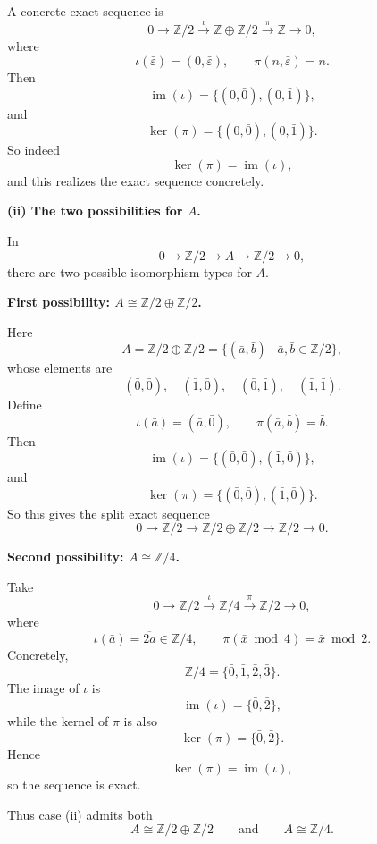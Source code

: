 \begin{solution}
A concrete exact sequence is
\[
0\longrightarrow \mathbb Z/2
\xrightarrow{\ \iota\ }
\mathbb Z\oplus \mathbb Z/2
\xrightarrow{\ \pi\ }
\mathbb Z
\longrightarrow 0,
\]
where
\[
\iota(\bar\varepsilon)=(0,\bar\varepsilon),
\qquad
\pi(n,\bar\varepsilon)=n.
\]
Then
\[
\operatorname{im}(\iota)=\{(0,\bar0),(0,\bar1)\},
\]
and
\[
\ker(\pi)=\{(0,\bar0),(0,\bar1)\}.
\]
So indeed
\[
\ker(\pi)=\operatorname{im}(\iota),
\]
and this realizes the exact sequence concretely.

\par

\textbf{(ii) The two possibilities for \(A\).}

In
\[
0\longrightarrow \mathbb Z/2 \longrightarrow A \longrightarrow \mathbb Z/2 \longrightarrow 0,
\]
there are two possible isomorphism types for \(A\).

\par

\textbf{First possibility: \(A\cong \mathbb Z/2\oplus \mathbb Z/2\).}

Here
\[
A=\mathbb Z/2\oplus \mathbb Z/2
=\{(\bar a,\bar b)\mid \bar a,\bar b\in \mathbb Z/2\},
\]
whose elements are
\[
(\bar0,\bar0),\quad (\bar1,\bar0),\quad (\bar0,\bar1),\quad (\bar1,\bar1).
\]
Define
\[
\iota(\bar a)=(\bar a,\bar0),
\qquad
\pi(\bar a,\bar b)=\bar b.
\]
Then
\[
\operatorname{im}(\iota)=\{(\bar0,\bar0),(\bar1,\bar0)\},
\]
and
\[
\ker(\pi)=\{(\bar0,\bar0),(\bar1,\bar0)\}.
\]
So this gives the split exact sequence
\[
0\longrightarrow \mathbb Z/2
\longrightarrow \mathbb Z/2\oplus \mathbb Z/2
\longrightarrow \mathbb Z/2
\longrightarrow 0.
\]

\par

\textbf{Second possibility: \(A\cong \mathbb Z/4\).}

Take
\[
0\longrightarrow \mathbb Z/2
\xrightarrow{\ \iota\ }
\mathbb Z/4
\xrightarrow{\ \pi\ }
\mathbb Z/2
\longrightarrow 0,
\]
where
\[
\iota(\bar a)=\overline{2a}\in \mathbb Z/4,
\qquad
\pi(\bar x \bmod 4)=\bar x \bmod 2.
\]
Concretely,
\[
\mathbb Z/4=\{\bar0,\bar1,\bar2,\bar3\}.
\]
The image of \(\iota\) is
\[
\operatorname{im}(\iota)=\{\bar0,\bar2\},
\]
while the kernel of \(\pi\) is also
\[
\ker(\pi)=\{\bar0,\bar2\}.
\]
Hence
\[
\ker(\pi)=\operatorname{im}(\iota),
\]
so the sequence is exact.

Thus case (ii) admits both
\[
A\cong \mathbb Z/2\oplus \mathbb Z/2
\qquad\text{and}\qquad
A\cong \mathbb Z/4.
\]

\par


\end{solution}
